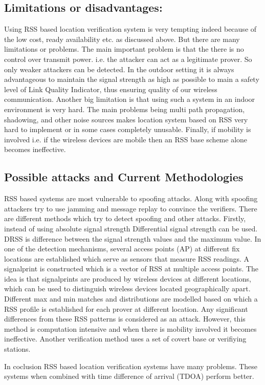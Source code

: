 \subsection{Limitations or disadvantages:} \label{rss_limitations}

Using RSS based location verification system is very tempting indeed because of the low cost, ready availability etc. as discussed above. But there are many limitations or problems. The main important problem is that the there is no control over transmit power. i.e. the attacker can act as a legitimate prover. So only weaker attackers can be detected. In the outdoor setting it is always advantageous to maintain the signal strength as high as possible to main a safety level of Link Quality Indicator, thus ensuring quality of our wireless communication. 
Another big limitation is that using such a system in an indoor environment is very hard. The main problems being multi path propagation, shadowing, and other noise sources makes location system based on RSS very hard to implement or in some cases completely unusable. 
Finally, if mobility is involved i.e. if the wireless devices are mobile then an RSS base scheme alone becomes ineffective.


\subsection{Possible attacks and Current Methodologies} \label{rss_attacks}
RSS based systems are most vulnerable to spoofing attacks. Along with spoofing attackers try to use jamming and message replay to convince the verifiers.
There are different methods which try to detect spoofing and other attacks. Firstly, instead of using absolute signal strength Differential signal strength can be used. DRSS is difference between the signal strength values and the maximum value. In one of the detection mechanisms, several access points (AP) at different fix locations are established which serve as sensors that measure RSS readings. A signalprint is constructed which is a vector of RSS at multiple access points. The idea is that signalprints are produced by wireless devices at different locations, which can be used to distinguish wireless devices located geographically apart. Different max and min matches and distributions are modelled based on which a RSS profile is established for each prover at different location. Any significant differences from these RSS patterns is considered as an attack. However, this method is computation intensive and when there is mobility involved it becomes ineffective.  Another verification method uses a set of covert base or verifiying stations. 

In coclusion RSS based location verification systems have many problems. These systems when combined with time difference of arrival (TDOA) perform better.


